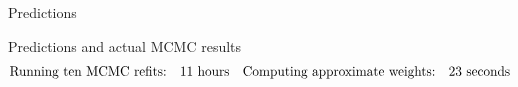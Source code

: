 \begin{frame}[t]{Predictions}
    \LaxPredictionFigOne{}
\end{frame}


\begin{frame}[t]{Predictions and actual MCMC results}
    \LaxPredictionFigTwo{}
    \vspace{-3em}
    $$
    \begin{aligned}
        \textrm{Running ten MCMC refits:}\quad & 11 \textrm{ hours} &
        \textrm{Computing approximate weights:}\quad &23 \textrm{ seconds}\\
    \end{aligned}
    $$
\end{frame}







\def\res{\varepsilon}
\def\w{w}
\def\wtil{\tilde{\w}}
\def\reshat{\hat{\res}}

\def\methodrow#1#2#3{
\begin{minipage}[t]{0.15\textwidth}
    \centering
    #1
\end{minipage}
\hfill
\begin{minipage}[t]{0.4\textwidth}
    \centering
    \vspace{-2em}
    #2
    \pause
\end{minipage}
\hfill
\begin{minipage}[t]{0.4\textwidth}
    \centering
    \vspace{-2em}
    #3
    \pause
\end{minipage}
}


\def\methodspacer{
    \vspace{1em}
    \hrule
    \vspace{1em}
}

